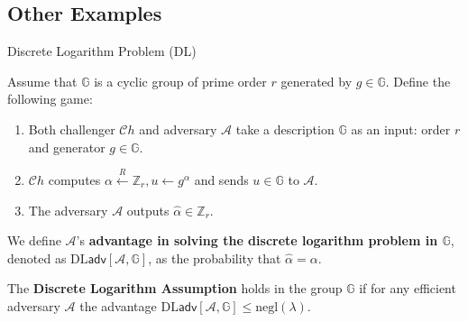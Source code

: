 \documentclass{beamer}
\begin{document}
    \subsection{Other Examples}
    \begin{frame}{Discrete Logarithm Problem (DL)}
        \begin{definition}
            Assume that $\mathbb{G}$ is a cyclic group of prime order $r$ generated by $g \in \mathbb{G}$. Define the following game:
            \begin{enumerate}
                \item Both challenger $\mathcal{C}h$ and adversary $\mathcal{A}$ take a description $\mathbb{G}$ as an input: order $r$ and generator $g \in \mathbb{G}$.\pause
                \item $\mathcal{C}h$ computes $\alpha \xleftarrow{R} \mathbb{Z}_r, u \gets g^{\alpha}$ and sends $u \in \mathbb{G}$ to $\mathcal{A}$.\pause
                \item The adversary $\mathcal{A}$ outputs $\hat{\alpha} \in \mathbb{Z}_r$.\pause
            \end{enumerate}
        
            We define $\mathcal{A}$'s \textbf{advantage in solving the discrete logarithm problem in $\mathbb{G}$}, denoted as $\text{DL}\mathsf{adv}[\mathcal{A},\mathbb{G}]$, as the probability that $\hat{\alpha} = \alpha$.\pause
        \end{definition}
        
        \begin{definition}
            The \textbf{Discrete Logarithm Assumption} holds in the group $\mathbb{G}$ if for any efficient adversary $\mathcal{A}$ the advantage $\text{DL}\mathsf{adv}[\mathcal{A},\mathbb{G}] \leq \text{negl}(\lambda)$.
        \end{definition}
    \end{frame}
\end{document}
